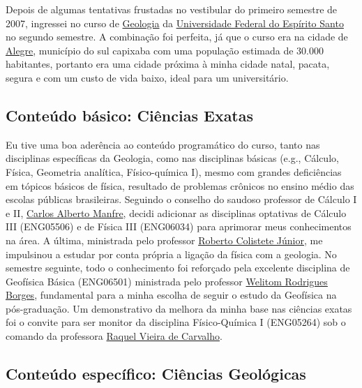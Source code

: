 \documentclass[10pt,a4paper,oneside]{book}
\begin{document}
Depois de algumas tentativas frustadas no vestibular do primeiro semestre de 2007, ingressei no curso de \href{https://geologia.ufes.br/}{Geologia} da \href{https://www.ufes.br/}{Universidade Federal do Espírito Santo} no segundo semestre. A combinação foi perfeita, já que o curso era na cidade de \href{https://alegre.es.gov.br/}{Alegre}, município do sul capixaba com uma população estimada de 30.000 habitantes, portanto era uma cidade próxima à minha cidade natal, pacata, segura e com um custo de vida baixo, ideal para um universitário.

\subsection{Conteúdo básico: Ciências Exatas}
\label{sec_geo_basico}

Eu tive uma boa aderência ao conteúdo programático do curso, tanto nas disciplinas específicas da Geologia, como nas disciplinas básicas (e.g., Cálculo, Física, Geometria analítica, Físico-química I), mesmo com grandes deficiências em tópicos básicos de física, resultado de problemas crônicos no ensino médio das escolas públicas brasileiras. Seguindo o conselho do saudoso professor de Cálculo I e II, \href{http://lattes.cnpq.br/8391815843000996}{Carlos Alberto Manfre}, decidi adicionar as disciplinas optativas de Cálculo III (ENG05506) e de Física III (ENG06034) para aprimorar meus conhecimentos na área. A última, ministrada pelo professor \href{http://lattes.cnpq.br/6503578618806955}{Roberto Colistete Júnior}, me impulsinou a estudar por conta própria a ligação da física com a geologia. No semestre seguinte, todo o conhecimento foi reforçado pela excelente disciplina de Geofísica Básica (ENG06501) ministrada pelo professor \href{http://lattes.cnpq.br/0799322864183147}{Welitom Rodrigues Borges}, fundamental para a minha escolha de seguir o estudo da Geofísica na pós-graduação. Um demonstrativo da melhora da minha base nas ciências exatas foi o convite para ser monitor da disciplina Físico-Química I (ENG05264) sob o comando da professora \href{http://lattes.cnpq.br/9146731989810239}{Raquel Vieira de Carvalho}.

\subsection{Conteúdo específico: Ciências Geológicas}
\label{sec_geo_especifico}
\end{document}
